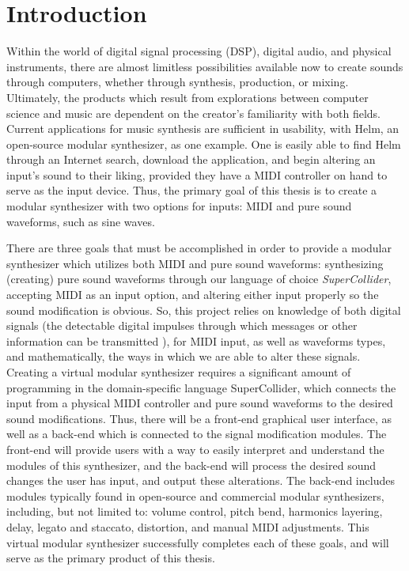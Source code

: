 \chapter{Introduction}\label{chapter:intro}

Within the world of digital signal processing (DSP), digital audio, and physical instruments, there are almost limitless possibilities available now to create sounds through computers, whether through synthesis, production, or mixing. Ultimately, the products which result from explorations between computer science and music are dependent on the creator's familiarity with both fields. Current applications for music synthesis are sufficient in usability, with Helm, an open-source modular synthesizer, as one example. One is easily able to find Helm through an Internet search, download the application, and begin altering an input's sound to their liking, provided they have a MIDI controller on hand to serve as the input device. Thus, the primary goal of this thesis is to create a modular synthesizer with two options for inputs: MIDI and pure sound waveforms, such as sine waves. 

There are three goals that must be accomplished in order to provide a modular synthesizer which utilizes both MIDI and pure sound waveforms: synthesizing (creating) pure sound waveforms through our language of choice \textit{SuperCollider}, accepting MIDI as an input option, and altering either input properly so the sound modification is obvious. So, this project relies on knowledge of both digital signals (the detectable digital impulses through which messages or other information can be transmitted \cite{Rosen_Howell_2011}), for MIDI input, as well as waveforms types, and mathematically, the ways in which we are able to alter these signals. Creating a virtual modular synthesizer requires a significant amount of programming in the domain-specific language SuperCollider, which connects the input from a physical MIDI controller and pure sound waveforms to the desired sound modifications. Thus, there will be a front-end graphical user interface, as well as a back-end which is connected to the signal modification modules. The front-end will provide users with a way to easily interpret and understand the modules of this synthesizer, and the back-end will process the desired sound changes the user has input, and output these alterations. The back-end includes modules typically found in open-source and commercial modular synthesizers, including, but not limited to: volume control, pitch bend, harmonics layering, delay, legato and staccato, distortion, and manual MIDI adjustments. This virtual modular synthesizer successfully completes each of these goals, and will serve as the primary product of this thesis.

